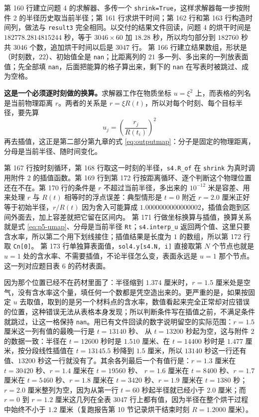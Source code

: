 第 160 行建立问题 4 的求解器、多传一个 \texttt{shrink=True}，这样求解器每一步按附件 2 的半径历史取当前半径；第 161 行求烘干时间；第 162 行和第 163 行构造时间列，做法与 \texttt{result3} 完全相同。以交付的结果文件回读，问题 4 的烘干时间是 $182778.2814815244$ 秒，等于 $3046\times60$ 加 $18.28$ 秒，所以均匀部分到 $182760$ 秒共 $3046$ 个数，追加烘干时间以后是 $3047$ 行。
第 166 行建立结果数组，形状是（时刻数，$22$）、初始值全是 \texttt{nan}；比距离列的 $21$ 多一列、多出来的一列放表面值；先全部填 \texttt{nan}，后面把能算的格子算出来，剩下的 \texttt{nan} 在写表时被跳过、成为空格。

\textbf{这是一个必须逐时刻做的换算。}求解器工作在物质坐标 $u=\xi^2$ 上，而表格的列名是当前物理距离 $r$。两者的关系是 $r=\xi R(t)$，所以对每个时刻、每个目标半径，要先算
\begin{equation}
u_j=\left(\frac{r_j}{R(t_i)}\right)^2
\label{eq:p5-umap}
\end{equation}
再去插值，这正是第二部分第九章的式 \eqref{eq:outputmap}：分子是固定的物理距离，分母是当前半径、随时间变化。

第 167 行按时刻循环，第 168 行取这一时刻的半径，\texttt{s4.R\_of} 在 \texttt{shrink} 为真时调用附件 2 的插值函数。第 169 行到第 172 行按距离循环、逐个判断这个物理位置还在不在。第 170 行的条件是 $r$ 不超过当前半径，多出来的 $10^{-12}$ 米是容差、用来处理 $r$ 与 $R(t)$ 相等时的浮点误差：典型情形是 $t=0$ 附近 $r=2.0$ 厘米正好等于初始半径，$r/R(t)$ 因为舍入可能算成 $1.0000000000000002$，插值会跑到区间外面去，加上容差就把它留在区间内。
第 171 行做坐标换算与插值，换算关系就是式 \eqref{eq:p5-umap}、分母是当前半径 \texttt{Rt}；\texttt{s4.interp\_u} 返回两个值、这里只要含水率，所以第二个用下划线接住；插值结果是长度为 $1$ 的数组，所以第 172 行取 \texttt{Cn[0]}。
第 173 行单独算表面值，\texttt{sol4.y[s4.N, i]} 直接取第 $N$ 个节点也就是 $u=1$ 处的含水率、不需要插值，不论半径怎么变，表面永远是 $u=1$ 那个节点。这一列对应题目表 6 的药材表面。

因为那个位置已经不在药材里面了：半径缩到 $1.374$ 厘米时，$r=1.5$ 厘米处是空气，没有含水率这个量，填任何一个数都是凭空造出来的。更严重的是，如果按固定 $u$ 去取值，取到的是另一个材料点的含水率，数值看起来完全正常却对应错误的位置，这种错误无法从表格本身发现；所以判断条件写在插值之前，不满足条件就跳过，让这一格保持 \texttt{nan}。用已有文件回读的数字说明留空的实际范围：$r=1.5$ 厘米这一列有值的最晚一行是 $t=13140$ 秒、
从 $t=13200$ 秒起为空，这与附件 2 的数据一致：半径在 $t=12600$ 秒时是 $1.510$ 厘米、在 $t=14400$ 秒时是 $1.477$ 厘米，按分段线性插值在 $t=13145.5$ 秒降到 $1.5$ 厘米，所以 $13140$ 秒这一行还有值、$13200$ 秒这一行就没有了。其余各列最后一个有值行是：$r=1.3$ 厘米在 $t=30420$ 秒、$r=1.4$ 厘米在 $t=19560$ 秒、
$r=1.6$ 厘米在 $t=8400$ 秒、$r=1.7$ 厘米在 $t=5460$ 秒、$r=1.8$ 厘米在 $t=3420$ 秒、$r=1.9$ 厘米在 $t=1380$ 秒；$r=2.0$ 厘米整列为空，因为从第一行 $t=60$ 秒起半径就已经小于 $2.0$ 厘米；而 $r=0$ 到 $r=1.2$ 厘米这几列在全表 $3047$ 行上都有值，因为半径在整个烘干过程中始终不小于 $1.2$ 厘米（复跑报告第 10 节记录烘干结束时刻 $R=1.2000$ 厘米）。

